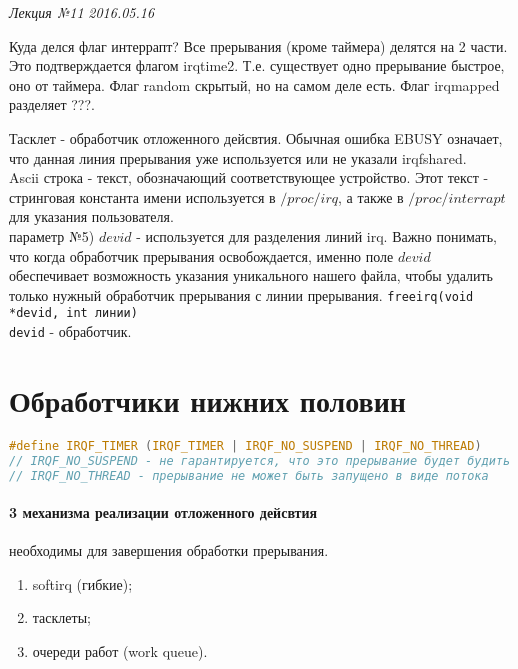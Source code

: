 \clearpage
\begin{flushright}
	\textit{Лекция №11}
	\textit{2016.05.16}
\end{flushright}

Куда делся флаг интеррапт? Все прерывания (кроме таймера) делятся на 2 части. Это подтверждается флагом irqtime2. Т.е. существует одно прерывание быстрое, оно от таймера. Флаг random скрытый, но на самом деле есть.  Флаг irqmapped разделяет ???.

Тасклет - обработчик отложенного дейсвтия. 
Обычная ошибка EBUSY означает, что данная линия прерывания уже используется или не указали irqfshared. \\
Ascii строка - текст, обозначающий соответствующее устройство. Этот текст - стринговая константа имени используется в $/proc/irq$, а также в $/proc/interrapt$ для указания пользователя.\\
параметр №5) $devid$ - используется для разделения линий irq. Важно понимать, что когда обработчик прерывания освобождается, именно поле $devid$ обеспечивает возможность указания уникального нашего файла, чтобы удалить только нужный обработчик прерывания с линии прерывания.
\verb|freeirq(void *devid, int линии)|\\
\verb|devid| - обработчик.

 

\section{Обработчики нижних половин}

\begin{lstlisting}[language=c]
#define IRQF_TIMER (IRQF_TIMER | IRQF_NO_SUSPEND | IRQF_NO_THREAD)
// IRQF_NO_SUSPEND - не гарантируется, что это прерывание будет будить системы, не отключать этот запрос прерывания при остановке
// IRQF_NO_THREAD - прерывание не может быть запущено в виде потока
\end{lstlisting}

\paragraph{3 механизма реализации отложенного дейсвтия} необходимы для завершения обработки прерывания.
\begin{enumerate}
	\item softirq (гибкие);
	\item тасклеты;
	\item очереди работ (work queue).
\end{enumerate}	

